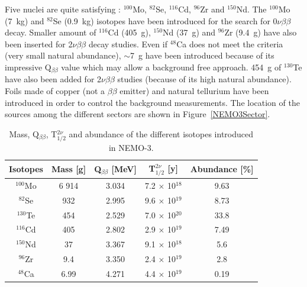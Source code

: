\documentclass[main.tex]{subfiles}
\begin{document}
\bigskip


\NI Five nuclei are quite satisfying : $^{\text{100}}$Mo, $^{\text{82}}$Se, $^{\text{116}}$Cd, $^{\text{96}}$Zr and $^{\text{150}}$Nd. The $^{\text{100}}$Mo (7~kg) and $^{\text{82}}$Se (0.9~kg) isotopes have been introduced for the search for 0$\nu\beta\beta$ decay. Smaller amount of $^{\text{116}}$Cd (405~g), $^{\text{150}}$Nd (37~g) and $^{\text{96}}$Zr (9.4~g) have also been inserted for 2$\nu\beta\beta$ decay studies. Even if $^{\text{48}}$Ca does not meet the criteria (very small natural abundance), $\sim$7~g have been introduced because of its impressive Q$_{\beta\beta}$ value which may allow a background free approach. 454~g of $^{\text{130}}$Te have also been added for 2$\nu\beta\beta$ studies (because of its high natural abundance). Foils made of copper (not a $\beta\beta$ emitter) and natural tellurium have been introduced in order to control the background measurements. The location of the sources among the different sectors are shown in Figure~\ref{NEMO3Sector}.


\bigskip



\begin{table}[h!]
\centering
\begin{tabular}{c|c|c|c|c}
Isotopes & Mass [g] & Q$_{\beta\beta}$ [MeV] & T$_{\text{1/2}}^{\text{2}\nu}$ [y] & Abundance [\%]\\[0.05cm]
\toprule
$^{\text{100}}$Mo & 6 914 & 3.034 & 7.2 $\times$ 10$^{\text{18}}$ & 9.63 \\[0.1cm]
$^{\text{82}}$Se  & 932   & 2.995 & 9.6 $\times$ 10$^{\text{19}}$ & 8.73 \\[0.1cm]
$^{\text{130}}$Te & 454   & 2.529 & 7.0 $\times$ 10$^{\text{20}}$ & 33.8 \\[0.1cm]
$^{\text{116}}$Cd & 405   & 2.802 & 2.9 $\times$ 10$^{\text{19}}$ & 7.49 \\[0.1cm]
$^{\text{150}}$Nd & 37    & 3.367 & 9.1 $\times$ 10$^{\text{18}}$ & 5.6  \\[0.1cm]
$^{\text{96}}$Zr  & 9.4   & 3.350 & 2.4 $\times$ 10$^{\text{19}}$ & 2.8  \\[0.1cm]
$^{\text{48}}$Ca  & 6.99  & 4.271 & 4.4 $\times$ 10$^{\text{19}}$ & 0.19 \\[0.1cm]
\bottomrule
\end{tabular}
\caption{Mass, Q$_{\beta\beta}$, T$_{\text{1/2}}^{\text{2}\nu}$ and abundance of the different isotopes introduced in NEMO-3.}
\label{tab:isotopeNEMO3}
\end{table} 
\end{document}

